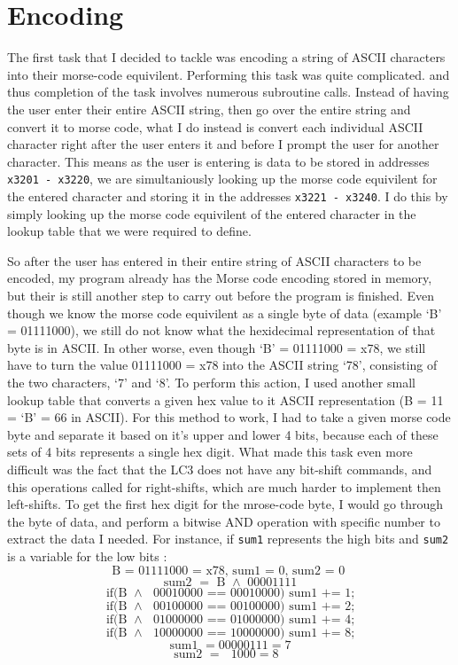\documentclass[a4paper,11pt]{article}
\begin{document}
\section{Encoding}
The first task that I decided to tackle was encoding a string of ASCII characters into their morse-code equivilent. Performing this task was quite complicated. and thus completion of the task involves numerous subroutine calls. Instead of having the user enter their entire ASCII string, then go over the entire string and convert it to morse code, what I do instead is convert each individual ASCII character right after the user enters it and before I prompt the user for another character. This means as the user is entering is data to be stored in addresses \texttt{x3201 - x3220}, we are simultaniously looking up the morse code equivilent for the entered character and storing it in the addresses \texttt{x3221 - x3240}. I do this by simply looking up the morse code equivilent of the entered character in the lookup table that we were required to define. \par
So after the user has entered in their entire string of ASCII characters to be encoded, my program already has the Morse code encoding stored in memory, but their is still another step to carry out before the program is finished. Even though we know the morse code equivilent as a single byte of data (example `B' = 01111000), we still do not know what the hexidecimal representation of that byte is in ASCII. In other worse, even though `B' = 01111000 = x78, we still have to turn the value 01111000 = x78 into the ASCII string `78', consisting of the two characters, `7' and `8'. To perform this action, I used another small lookup table that converts a given hex value to it ASCII representation (B = 11 = `B' = 66 in ASCII). For this method to work, I had to take a given morse code byte and separate it based on it's upper and lower 4 bits, because each of these sets of 4 bits represents a single hex digit. What made this task even more difficult was the fact that the LC3 does not have any bit-shift commands, and this operations called for right-shifts, which are much harder to implement then left-shifts. To get the first hex digit for the mrose-code byte, I would go through the byte of data, and perform a bitwise AND operation with specific number to extract the data I needed. For instance, if \texttt{sum1} represents the high bits and \texttt{sum2} is a variable for the low bits :
 $$  \text{B = $01111000$ = x$78$, sum1 = 0, sum2 = 0 }$$
 $$  \text{ sum2 $=$ B $\wedge$ 00001111 } $$
 $$  \text{if(B $\wedge$ $00010000$ == $00010000$) sum1 += 1;} $$
 $$  \text{if(B $\wedge$ $00100000$ == $00100000$) sum1 += 2;} $$
 $$  \text{if(B $\wedge$ $01000000$ == $01000000$) sum1 += 4;} $$
 $$  \text{if(B $\wedge$ $10000000$ == $10000000$) sum1 += 8;} $$
 $$  \text{sum1 } = 00000111 = 7 $$
 $$  \text{sum2 $=$ $1000 = 8$ } $$
\end{document}
